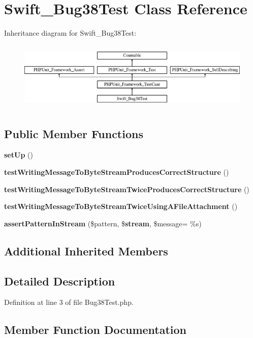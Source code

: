 \section{Swift\+\_\+\+Bug38\+Test Class Reference}
\label{class_swift___bug38_test}
Inheritance diagram for Swift\+\_\+\+Bug38\+Test\+:\begin{figure}[H]
\begin{center}
\leavevmode
\includegraphics[height=3.303835cm]{class_swift___bug38_test}
\end{center}
\end{figure}
\subsection*{Public Member Functions}
\begin{DoxyCompactItemize}
\item 
{\bf set\+Up} ()
\item 
{\bf test\+Writing\+Message\+To\+Byte\+Stream\+Produces\+Correct\+Structure} ()
\item 
{\bf test\+Writing\+Message\+To\+Byte\+Stream\+Twice\+Produces\+Correct\+Structure} ()
\item 
{\bf test\+Writing\+Message\+To\+Byte\+Stream\+Twice\+Using\+A\+File\+Attachment} ()
\item 
{\bf assert\+Pattern\+In\+Stream} (\$pattern, \${\bf stream}, \$message= \textquotesingle{}\%s\textquotesingle{})
\end{DoxyCompactItemize}
\subsection*{Additional Inherited Members}


\subsection{Detailed Description}


Definition at line 3 of file Bug38\+Test.\+php.



\subsection{Member Function Documentation}
